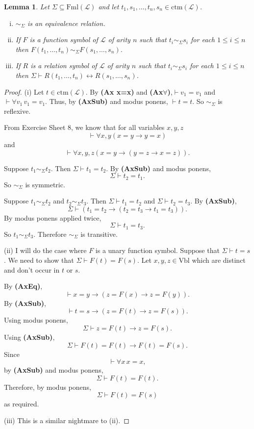 \documentclass[11pt]{article}
\newcommand{\proves}{\vdash}
\newcommand{\ctm}{\textrm{ctm}}
\newcommand{\Fml}{\textrm{Fml}}
\newcommand{\Vbl}{\textrm{Vbl}}
\newtheorem{lemma}[theorem]{Lemma}
\newcommand{\mcal}[1]{\mathcal{#1}}
\begin{document}
\begin{lemma}
Let $\Sigma\subseteq \Fml(\mcal{L})$ and let $t_1,s_1,\ldots,t_n,s_n\in\ctm(\mcal{L})$.
\begin{enumerate}[(i)]
\item $\sim_\Sigma$ is an equivalence relation.
\item If $F$ is a function symbol of $\mcal{L}$ of arity $n$ such that $t_i\sim_\Sigma s_i$ for each $1\leq i\leq n$ then $F(t_1,\ldots,t_n)\sim_\Sigma F(s_1,\ldots,s_n)$.
\item If $R$ is a relation symbol of $\mcal{L}$ of arity $n$ such that $t_i\sim_\Sigma s_i$ for each $1\leq i\leq n$ then $\Sigma \vdash R(t_1,\ldots,t_n)\leftrightarrow R(s_1,\ldots,s_n)$.
\end{enumerate}
\end{lemma}
\begin{proof}
(i) Let $t\in \ctm(\mcal{L})$. By \textbf{(Ax x=x)} and \textbf{(Ax$\forall$)},$\proves v_1=v_1$ and $\proves \forall v_1\, v_1=v_1$. Thus, by \textbf{(AxSub)} and modus ponens, $\proves t=t$. So $\sim_\Sigma$ is reflexive.

From Exercise Sheet 8, we know that for all variables $x,y,z$
\[\vdash \forall x,y (x=y\rightarrow y=x)\] and
\[\vdash \forall x,y,z (x=y\rightarrow (y=z\rightarrow x=z)).\]

Suppose $t_1\sim_\Sigma t_2$. Then $\Sigma\vdash t_1=t_2$.
By \textbf{(AxSub)} and modus ponens,
\[\Sigma\proves t_2=t_1.\] So $\sim_\Sigma$ is symmetric.

Suppose $t_1\sim_\Sigma t_2$ and $t_2\sim_\Sigma t_3$. Then $\Sigma\vdash t_1=t_2$ and $\Sigma\vdash t_2=t_3$.
By \textbf{(AxSub)},
\[\Sigma\proves (t_1=t_2\rightarrow (t_2=t_3\rightarrow t_1=t_3)).\] By modus ponens applied twice,
\[\Sigma\proves t_1=t_3.\] So $t_1\sim_\Sigma t_3$. Therefore $\sim_\Sigma$ is transitive.
\bigskip

\noindent
(ii) I will do the case where $F$ is a unary function symbol. Suppose that $\Sigma\proves t=s$. We need to show that $\Sigma\proves F(t)=F(s)$. Let $x,y,z\in \Vbl$ which are distinct and don't occur in $t$ or $s$.

By \textbf{(AxEq)},
\[\proves x=y\rightarrow (z=F(x)\rightarrow z=F(y)).\]
By \textbf{(AxSub)},
\[\proves t=s\rightarrow (z=F(t)\rightarrow z=F(s)).\] Using modus ponens,
\[\Sigma\proves z=F(t)\rightarrow z=F(s).\] Using \textbf{(AxSub)},
\[\Sigma\proves F(t)=F(t)\rightarrow F(t)=F(s).\] Since
\[\proves \forall x \, x=x,\] by \textbf{(AxSub)} and modus ponens,
\[\Sigma\proves F(t)=F(t).\] Therefore, by modus ponens,
\[\Sigma\proves F(t)=F(s)\] as required.
\bigskip

\noindent
(iii) This is a similar nightmare to (ii).

\end{proof}
\end{document}

